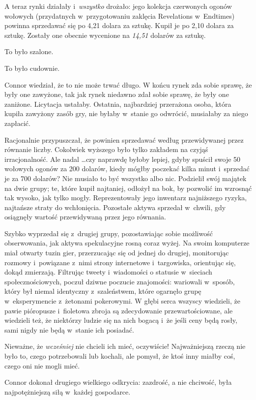 \documentclass[oneside,polish,11pt,rmheadings]{mwbk}
\begin{document}
A teraz rynki działały i~\textit{wszystko }drożało: jego kolekcja czerwonych ogonów wołowych (przydatnych w~przygotowaniu zaklęcia Revelations w~Endtimes) powinna sprzedawać się po 4,21 dolara za sztukę. Kupił je po 2,10 dolara za sztukę. Zostały one obecnie wycenione na \textit{14,51 }dolarów za sztukę.

To było szalone.

To było cudownie.

Connor wiedział, że to nie może trwać długo. W końcu rynek zda sobie sprawę, że były one zawyżone, tak jak rynek niedawno zdał sobie sprawę, że były one zaniżone. Licytacja ustałaby. Ostatnia, najbardziej przerażona osoba, która kupiła zawyżony zasób gry, nie byłaby w~stanie go odwrócić, musiałaby za niego zapłacić.

Racjonalnie przypuszczał, że powinien sprzedawać według przewidywanej przez równanie liczby. Cokolwiek wyższego było tylko zakładem na czyjąś irracjonalność. Ale nadal  \ldots  czy naprawdę byłoby lepiej, gdyby spuścił swoje 50 wołowych ogonów za 200 dolarów, kiedy mógłby poczekać kilka minut i~sprzedać je za 700 dolarów? Nie musiało to być wszystko albo nic. Podzielił swój majątek na dwie grupy; te, które kupił najtaniej, odłożył na bok, by pozwolić im wzrosnąć tak wysoko, jak tylko mogły. Reprezentowały jego inwentarz najniższego ryzyka, najtańsze straty do wchłonięcia. Pozostałe aktywa sprzedał w~chwili, gdy osiągnęły wartość przewidywaną przez jego równania.

Szybko wyprzedał się z~drugiej grupy, pozostawiając sobie możliwość obserwowania, jak aktywa spekulacyjne rosną coraz wyżej. Na swoim komputerze miał otwarty tuzin gier, przerzucając się od jednej do drugiej, monitorując rozmowy i~powiązane z~nimi strony internetowe i~targowiska, orientując się, dokąd zmierzają. Filtrując tweety i~wiadomości o statusie w~sieciach społecznościowych, poczuł dziwne poczucie znajomości: wariowali w~sposób, który był niemal identyczny z~szaleństwem, które ogarnęło grupę w~eksperymencie z~żetonami pokerowymi. W głębi serca wszyscy wiedzieli, że pawie pióropusze i~fioletowa zbroja są zdecydowanie przewartościowane, ale wiedzieli też, że niektórzy ludzie się na nich bogacą i~że jeśli ceny będą rosły, sami nigdy nie będą w~stanie ich posiadać.

Nieważne, że \textit{wcześniej }nie chcieli ich mieć, oczywiście! Najważniejszą rzeczą nie było to, czego potrzebowali lub kochali, ale pomysł, że ktoś inny miałby coś, czego oni nie mogli mieć.

Connor dokonał drugiego wielkiego odkrycia: zazdrość, a nie chciwość, była najpotężniejszą siłą w~każdej gospodarce.
\end{document}
